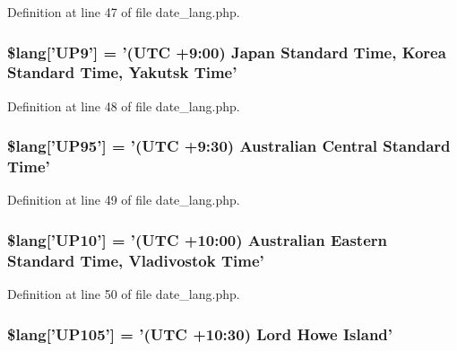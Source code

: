 Definition at line 47 of file date\-\_\-lang.\-php.

\hypertarget{date__lang_8php_aa112bfd057369e5adb437c55457c9f79}{
\subsubsection[{\$lang}]{\setlength{\rightskip}{0pt plus 5cm}\$lang\mbox{[}'U\-P9'\mbox{]} = '(U\-T\-C +9\-:00) Japan Standard Time, Korea Standard Time, Yakutsk Time'}}\label{date__lang_8php_aa112bfd057369e5adb437c55457c9f79}


Definition at line 48 of file date\-\_\-lang.\-php.

\hypertarget{date__lang_8php_a96965669ac4830ab024b39a4ebb763f1}{
\subsubsection[{\$lang}]{\setlength{\rightskip}{0pt plus 5cm}\$lang\mbox{[}'U\-P95'\mbox{]} = '(U\-T\-C +9\-:30) Australian Central Standard Time'}}\label{date__lang_8php_a96965669ac4830ab024b39a4ebb763f1}


Definition at line 49 of file date\-\_\-lang.\-php.

\hypertarget{date__lang_8php_ab55df5b1ac6457c16ea32f01070966f6}{
\subsubsection[{\$lang}]{\setlength{\rightskip}{0pt plus 5cm}\$lang\mbox{[}'U\-P10'\mbox{]} = '(U\-T\-C +10\-:00) Australian Eastern Standard Time, Vladivostok Time'}}\label{date__lang_8php_ab55df5b1ac6457c16ea32f01070966f6}


Definition at line 50 of file date\-\_\-lang.\-php.

\hypertarget{date__lang_8php_aeb674ae9d76fd6d0d9c9e77ed5a212e9}{
\subsubsection[{\$lang}]{\setlength{\rightskip}{0pt plus 5cm}\$lang\mbox{[}'U\-P105'\mbox{]} = '(U\-T\-C +10\-:30) Lord Howe Island'}}\label{date__lang_8php_aeb674ae9d76fd6d0d9c9e77ed5a212e9}


